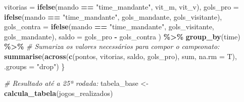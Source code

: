 \documentclass[11pt,]{article}
\newenvironment{Shaded}{\begin{snugshade}}{\end{snugshade}}
\newcommand{\AttributeTok}[1]{\textcolor[rgb]{0.13,0.29,0.53}{#1}}
\newcommand{\CommentTok}[1]{\textcolor[rgb]{0.56,0.35,0.01}{\textit{#1}}}
\newcommand{\FunctionTok}[1]{\textcolor[rgb]{0.13,0.29,0.53}{\textbf{#1}}}
\newcommand{\NormalTok}[1]{#1}
\newcommand{\OtherTok}[1]{\textcolor[rgb]{0.56,0.35,0.01}{#1}}
\newcommand{\SpecialCharTok}[1]{\textcolor[rgb]{0.81,0.36,0.00}{\textbf{#1}}}
\newcommand{\StringTok}[1]{\textcolor[rgb]{0.31,0.60,0.02}{#1}}
\begin{document}
\begin{Shaded}
\begin{Highlighting}[]
            \AttributeTok{vitorias =} \FunctionTok{ifelse}\NormalTok{(mando }\SpecialCharTok{==} \StringTok{"time\_mandante"}\NormalTok{, vit\_m, vit\_v),}
            \AttributeTok{gols\_pro =} \FunctionTok{ifelse}\NormalTok{(mando }\SpecialCharTok{==} \StringTok{"time\_mandante"}\NormalTok{, gols\_mandante,}
\NormalTok{                              gols\_visitante),}
            \AttributeTok{gols\_contra =} \FunctionTok{ifelse}\NormalTok{(mando }\SpecialCharTok{==} \StringTok{"time\_mandante"}\NormalTok{, gols\_visitante,}
\NormalTok{                                 gols\_mandante),}
            \AttributeTok{saldo =}\NormalTok{ gols\_pro }\SpecialCharTok{{-}}\NormalTok{ gols\_contra}
\NormalTok{        ) }\SpecialCharTok{\%\textgreater{}\%}
        \FunctionTok{group\_by}\NormalTok{(time) }\SpecialCharTok{\%\textgreater{}\%}
        \CommentTok{\# Sumariza os valores necessários para compor o campeonato:}
        \FunctionTok{summarise}\NormalTok{(}\FunctionTok{across}\NormalTok{(}\FunctionTok{c}\NormalTok{(pontos, vitorias, saldo, gols\_pro),}
\NormalTok{                         sum, }\AttributeTok{na.rm =}\NormalTok{ T), }\AttributeTok{.groups =} \StringTok{"drop"}\NormalTok{)}
\NormalTok{\}}

\CommentTok{\# Resultado até a 25ª rodada:}
\NormalTok{tabela\_base }\OtherTok{\textless{}{-}} \FunctionTok{calcula\_tabela}\NormalTok{(jogos\_realizados)}
\end{Highlighting}
\end{Shaded}
\end{document}
